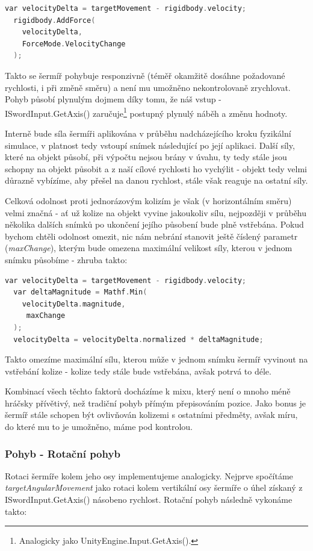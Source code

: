 \begin{lstlisting}[language=C, basicstyle=\fontsize{11}{13}\selectfont\ttfamily]
  var velocityDelta = targetMovement - rigidbody.velocity;
  rigidbody.AddForce(
    velocityDelta,
    ForceMode.VelocityChange
  );
\end{lstlisting}


Takto se šermíř pohybuje responzivně (téměř okamžitě dosáhne požadované rychlosti, i při změně směru) a není mu umožněno nekontrolovaně zrychlovat. Pohyb působí plynulým dojmem díky tomu, že náš vstup - ISwordInput.GetAxis() zaručuje\footnote{Analogicky jako UnityEngine.Input.GetAxis().} postupný plynulý náběh a změnu hodnoty.

Interně bude síla šermíři aplikována v průběhu nadcházejícího kroku fyzikální simulace, v platnost tedy vstoupí snímek následující po její aplikaci. Další síly, které na objekt působí, při výpočtu nejsou brány v úvahu, ty tedy stále jsou schopny na objekt působit a z naší cílové rychlosti ho vychýlit - objekt tedy velmi důrazně vybízíme, aby přešel na danou rychlost, stále však reaguje na ostatní síly. 

Celková odolnost proti jednorázovým kolizím je však (v horizontálním směru) velmi značná - ať už kolize na objekt vyvine jakoukoliv sílu, nejpozději v průběhu několika dalších snímků po ukončení jejího působení bude plně vstřebána. Pokud bychom chtěli odolnost omezit, nic nám nebrání stanovit ještě číslený parametr (\textit{maxChange}), kterým bude omezena maximální velikost síly, kterou v jednom snímku působíme - zhruba takto:

\begin{lstlisting}[language=C, basicstyle=\fontsize{11}{13}\selectfont\ttfamily]
  var velocityDelta = targetMovement - rigidbody.velocity;
  var deltaMagnitude = Mathf.Min(
    velocityDelta.magnitude,
     maxChange
  );
  velocityDelta = velocityDelta.normalized * deltaMagnitude;
\end{lstlisting}

Takto omezíme maximální sílu, kterou může v jednom snímku šermíř vyvinout na vstřebání kolize - kolize tedy stále bude vstřebána, avšak potrvá to déle.

Kombinací všech těchto faktorů docházíme k mixu, který není o mnoho méně hráčsky přívětivý, než tradiční pohyb přímým přepisováním pozice. Jako bonus je šermíř stále schopen být ovlivňován kolizemi s ostatními předměty, avšak míru, do které mu to je umožněno, máme pod kontrolou.

\subsubsection*{Pohyb - Rotační pohyb}
Rotaci šermíře kolem jeho osy implementujeme analogicky. Nejprve spočítáme \textit{targetAngularMovement} jako rotaci kolem vertikální osy šermíře o úhel získaný z ISwordInput.GetAxis() násobeno rychlost. Rotační pohyb následně vykonáme takto:

